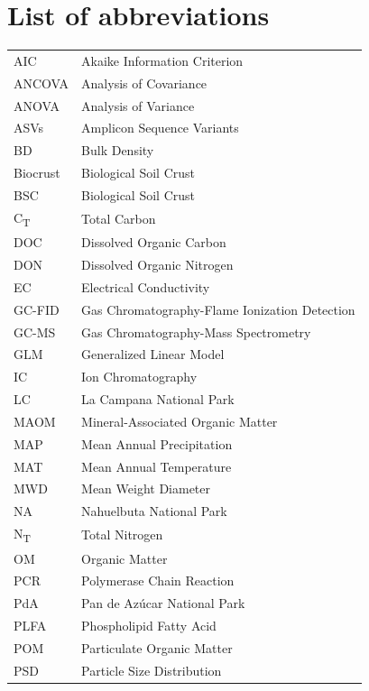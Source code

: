 \chapter*{List of abbreviations}

\begin{longtable}{@{}l@{\hspace{2cm}}l@{}}
AIC       & Akaike Information Criterion\\
ANCOVA    & Analysis of Covariance\\
ANOVA     & Analysis of Variance\\
ASVs      & Amplicon Sequence Variants\\
BD        & Bulk Density\\
Biocrust   & Biological Soil Crust\\
BSC       & Biological Soil Crust\\
C\textsubscript{T}        & Total Carbon\\
DOC       & Dissolved Organic Carbon\\
DON       & Dissolved Organic Nitrogen\\
EC        & Electrical Conductivity\\
GC-FID    & Gas Chromatography-Flame Ionization Detection\\
GC-MS     & Gas Chromatography-Mass Spectrometry\\
GLM       & Generalized Linear Model\\
IC        & Ion Chromatography\\
LC        & La Campana National Park\\
MAOM      & Mineral-Associated Organic Matter\\
MAP       & Mean Annual Precipitation\\
MAT       & Mean Annual Temperature\\
MWD       & Mean Weight Diameter\\
NA        & Nahuelbuta National Park\\
N\textsubscript{T}        & Total Nitrogen\\
OM        & Organic Matter\\
PCR       & Polymerase Chain Reaction\\
PdA       & Pan de Azúcar National Park\\
PLFA      & Phospholipid Fatty Acid\\
POM       & Particulate Organic Matter\\
PSD       & Particle Size Distribution\\

\end{longtable}
